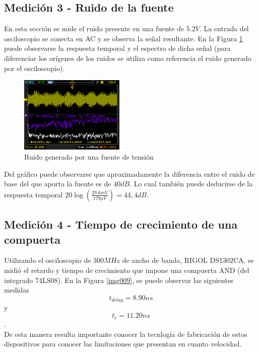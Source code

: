 \documentclass[a4paper,10pt]{article}
\begin{document}
	\subsection{Medición 3 - Ruido de la fuente}
	\indent En esta secci\'on se mide el ruido presente en una fuente de $5.2V$.
	La entrada del osciloscopio se conecta en AC y se observa la se\~nal 
	resultante. En la Figura \ref{img008} puede observarse la respuesta temporal
	y el espectro de dicha se\~nal (para diferenciar los or\'igenes de los 
	ruidos se utiliza como referencia el ruido generado por el osciloscopio).

		\begin{figure}[!htb]
			\centering
			\includegraphics[width=5cm]
			{Imagenes/RuidoFuente.png}
			\caption{Ruido generado por una fuente de tensi\'on}
			\label{img008}
		\end{figure}
	\indent Del gr\'afico puede observarse que aproximadamente la diferencia 
	entre el ruido de base del que aporta la fuente es de $40dB$. Lo cual 
	tambi\'en puede deducirse de la respuesta temporal 
	$20\log(\frac{29.6mV}{179\mu V})=44,4dB$.

	\subsection{Medición 4 - Tiempo de crecimiento de una compuerta}
	\indent Utilizando el osciloscopio de $300MHz$ de ancho de banda, RIGOL 
	DS1302CA, se midi\'o el retardo y tiempo de crecimiento que impone una 
	compuerta AND (del integrado 74LS08). En la Figura \ref{img009}, se puede 
	observar las siguientes medidas $$t_{delay}=8.90ns$$y  $$t_{c}=11.20ns$$. \\
	\indent De esta manera resulta importante conocer la tecnlog\'ia de 
	fabricaci\'on de estos dispositivos para conocer las limitaciones que 
	presentan en cuanto velocidad.
		
\end{document}
